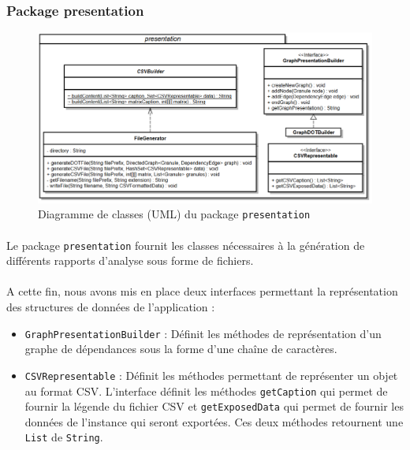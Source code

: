 \documentclass{scrartcl}
\begin{document}
\subsubsection{Package presentation}
    \begin{figure}[h!]
        \centering
        \includegraphics[width=\textwidth]{img/uml/presentation.png}
        \caption{Diagramme de classes (UML) du package \texttt{presentation}}
    \end{figure}

    \paragraph{}Le package \texttt{presentation} fournit les classes nécessaires à la génération de différents rapports d'analyse sous forme de fichiers. 
    
    \paragraph{}A cette fin, nous avons mis en place deux interfaces permettant la représentation des structures de données de l'application :
    \begin{itemize}
        \item \texttt{GraphPresentationBuilder} : Définit les méthodes de représentation d'un graphe de dépendances sous la forme d'une chaîne de caractères.
        \item \texttt{CSVRepresentable} : Définit les méthodes permettant de représenter un objet au format CSV. L'interface définit les méthodes \texttt{getCaption} qui permet de fournir la légende du fichier CSV et \texttt{getExposedData} qui permet de fournir les données de l'instance qui seront exportées. Ces deux méthodes retournent une \texttt{List} de \texttt{String}.
    \end{itemize}
    
\end{document}
